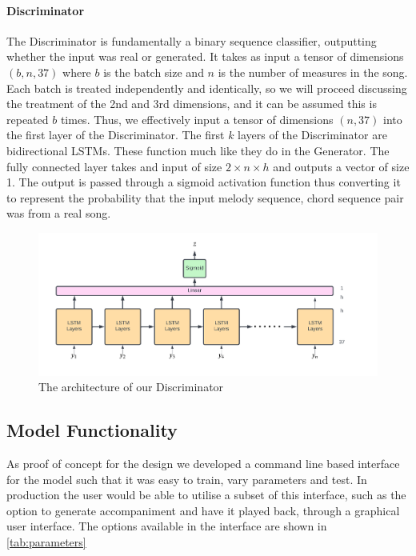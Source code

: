 \paragraph{Discriminator}
The Discriminator is fundamentally a binary sequence classifier, outputting whether the input was real or generated.
It takes as input a tensor of dimensions $(b,n,37)$ where $b$ is the batch size and $n$ is the number of measures in the song.
Each batch is treated independently and identically, so we will proceed discussing the treatment of the 2nd and 3rd dimensions, and it can be assumed this is repeated $b$ times.
Thus, we effectively input a tensor of dimensions $(n,37)$ into the first layer of the Discriminator.
The first $k$ layers of the Discriminator are bidirectional LSTMs. 
These function much like they do in the Generator.
The fully connected layer takes and input of size $2 \times n \times h$ and outputs a vector of size 1.
The output is passed through a sigmoid activation function thus converting it to represent the probability that the input melody sequence, chord sequence pair was from a real song.

\begin{figure}
    \centering
    \includegraphics[width=0.8\columnwidth]{Figures/Discriminator}
    \decoRule
    \caption{The architecture of our Discriminator}
    \label{fig:Discriminator}
\end{figure}


\subsection{Model Functionality}

As proof of concept for the design we developed a command line based interface for the model such that it was easy to train, vary parameters and test. 
In production the user would be able to utilise a subset of this interface, such as the option to generate accompaniment and have it played back, through a graphical user interface.
The options available in the interface are shown in \autoref{tab:parameters}

